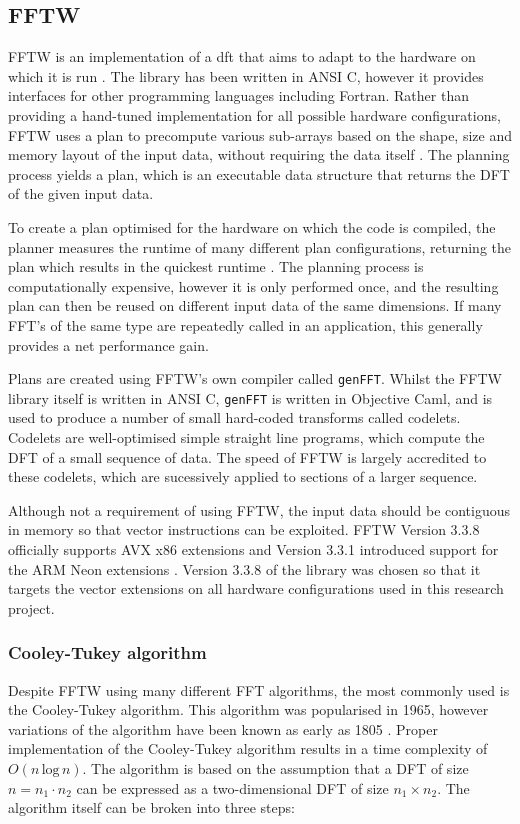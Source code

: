 \documentclass[a4paper,11pt]{report}
\begin{document}
\subsection{FFTW}
FFTW is an implementation of a \gls{dft} that aims to adapt to the hardware on which it is run \cite{frigo2005design}. The library has been written in ANSI C, however it provides interfaces for other programming languages including Fortran. Rather than providing a hand-tuned implementation for all possible hardware configurations, FFTW uses a plan to precompute various sub-arrays based on the shape, size and memory layout of the input data, without requiring the data itself \cite{frigo2005design}. The planning process yields a plan, which is an executable data structure that returns the DFT of the given input data. 
\par
To create a plan optimised for the hardware on which the code is compiled, the planner measures the runtime of many different plan configurations, returning the plan which results in the quickest runtime \cite{frigo2005design}. The planning process is computationally expensive, however it is only performed once, and the resulting plan can then be reused on different input data of the same dimensions. If many FFT's of the same type are repeatedly called in an application, this generally provides a net performance gain.
\par
Plans are created using FFTW's own compiler called \texttt{genFFT}. Whilst the FFTW library itself is written in ANSI C, \texttt{genFFT} is written in Objective Caml, and is used to produce a number of small hard-coded transforms called codelets. Codelets are well-optimised simple straight line programs, which compute the DFT of a small sequence of data. The speed of FFTW is largely accredited to these codelets, which are sucessively applied to sections of a larger sequence. 
\par
Although not a requirement of using FFTW, the input data should be contiguous in memory so that vector instructions can be exploited. FFTW Version 3.3.8 officially supports AVX x86 extensions and Version 3.3.1 introduced support for the ARM Neon extensions \cite{frigo2003fftw}. Version 3.3.8 of the library was chosen so that it targets the vector extensions on all hardware configurations used in this research project. 


\subsubsection{Cooley-Tukey algorithm}
Despite FFTW using many different FFT algorithms, the most commonly used is the Cooley-Tukey algorithm. This algorithm was popularised in 1965, however variations of the algorithm have been known as early as 1805 \cite{cooley1965algorithm, heideman1985gauss}. Proper implementation of the Cooley-Tukey algorithm results in a time complexity of $O(n\, \textrm{log}\, n)$. The algorithm is based on the assumption that a DFT of size $n = n_{1} \cdot n_{2}$ can be expressed as a two-dimensional DFT of size $n_{1} \times n_{2}$. The algorithm itself can be broken into three steps: 
\end{document}
